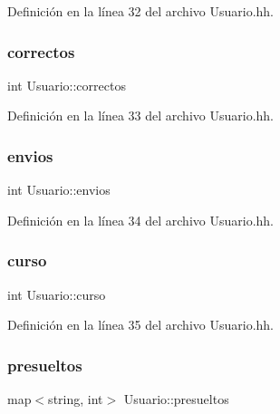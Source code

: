 Definición en la línea 32 del archivo Usuario.\+hh.

\mbox{\label{class_usuario_a6d7fd52e0625b61d324922bf4783435e}} 
\subsubsection{\texorpdfstring{correctos}{correctos}}
{\footnotesize\ttfamily int Usuario\+::correctos\hspace{0.3cm}{\ttfamily [private]}}



Definición en la línea 33 del archivo Usuario.\+hh.

\mbox{\label{class_usuario_a485a741c0646e6414bd6cf669a77fc9c}} 
\subsubsection{\texorpdfstring{envios}{envios}}
{\footnotesize\ttfamily int Usuario\+::envios\hspace{0.3cm}{\ttfamily [private]}}



Definición en la línea 34 del archivo Usuario.\+hh.

\mbox{\label{class_usuario_aa767fe2d1198f2c97791073bc55803e7}} 
\subsubsection{\texorpdfstring{curso}{curso}}
{\footnotesize\ttfamily int Usuario\+::curso\hspace{0.3cm}{\ttfamily [private]}}



Definición en la línea 35 del archivo Usuario.\+hh.

\mbox{\label{class_usuario_ae614e565ce48a314a1e2b05beee8567b}} 
\subsubsection{\texorpdfstring{presueltos}{presueltos}}
{\footnotesize\ttfamily map$<$string, int$>$ Usuario\+::presueltos\hspace{0.3cm}{\ttfamily [private]}}



